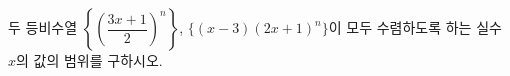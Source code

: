 두 등비수열 $\left\{\left(\dfrac{3x+1}{2}\right)^n\right\}$, $\{(x-3)(2x+1)^n\}$이 모두 수렴하도록 하는 실수 $x$의 값의 범위를 구하시오.
